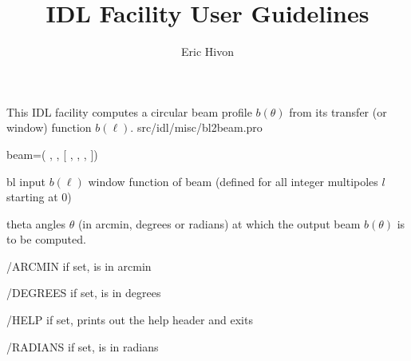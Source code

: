 

\sloppy

\title{\healpix IDL Facility User Guidelines}
 \section[bl2beam]{ }
\label{idl:bl2beam}
\author{Eric Hivon}

\begin{facility}
{This IDL facility computes a circular beam profile $b(\theta)$ from its transfer (or window) function $b(\ell)$.
}
{src/idl/misc/bl2beam.pro}
\end{facility}

\begin{IDLformat}
{%
{beam}=\thedocid(
, 
, %
[%
 ,
, 
, 
%
])}
\end{IDLformat}

\begin{qualifiers}
  \begin{qulist}{} %
    \item[bl] %
      input $b(\ell)$ window function of beam (defined for all integer multipoles $l$ starting at 0)
    \item[theta] %
    angles $\theta$ (in arcmin, degrees or radians) 
  at which the output beam $b(\theta)$ is to be computed.
  \end{qulist}
\end{qualifiers}

\begin{keywords}
  \begin{kwlist}{} %
    \item[/ARCMIN] %
	if set,  is in arcmin
    \item[/DEGREES] %
	if set,  is in degrees
    \item[/HELP] %
	if set, prints out the help header and exits
    \item[/RADIANS] %
	if set,  is in radians
  \end{kwlist}
\end{keywords}  

